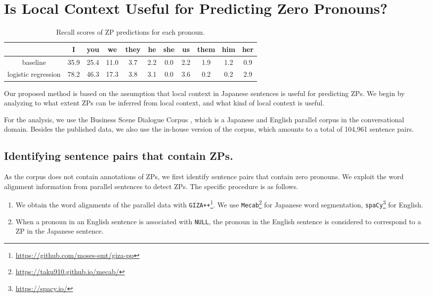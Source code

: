 \section{Is Local Context Useful for Predicting Zero Pronouns?}
\label{section:analysis}

\begin{table*}[t]
\centering
\begin{tabular}{ccccccccccc}\toprule
                    & I    & you    & we    & they & he  & she & us  & them & him & her \\ \midrule
baseline            & 35.9 & 25.4   & 11.0  & 3.7  & 2.2 & 0.0 & 2.2 & 1.9  & 1.2 & 0.9 \\
logistic regression & 78.2 & 46.3   & 17.3  & 3.8  & 3.1 & 0.0 & 3.6 & 0.2  & 0.2 & 2.9 \\ \bottomrule
\end{tabular}
\caption{Recall scores of ZP predictions for each pronoun.}
\label{result:logistic}
\end{table*}

Our proposed method is based on the assumption that local context in Japanese sentences is useful for predicting ZPs.
We begin by analyzing to what extent ZPs can be inferred from local context, and what kind of local context is useful.

For the analysis, we use the Business Scene Dialogue Corpus \citep{rikters-etal-2019-designing}, which is a Japanese and English parallel corpus in the conversational domain.
Besides the published data, we also use the in-house version of the corpus, which amounts to a total of 104,961 sentence pairs.

\subsection{Identifying sentence pairs that contain ZPs.}
As the corpus does not contain annotations of ZPs, we first identify sentence pairs that contain zero pronouns.
We exploit the word alignment information from parallel sentences to detect ZPs. The specific procedure is as follows.

\begin{enumerate}
  \item We obtain the word alignments of the parallel data with \texttt{GIZA++}\footnote{\url{https://github.com/moses-smt/giza-pp}}. We use \texttt{Mecab}\footnote{\url{https://taku910.github.io/mecab/}} for Japanese word segmentation, \texttt{spaCy}\footnote{\url{https://spacy.io/}} for English.
  \item When a pronoun in an English sentence is associated with \texttt{NULL}, the pronoun in the English sentence is considered to correspond to a ZP in the Japanese sentence.
\end{enumerate}

